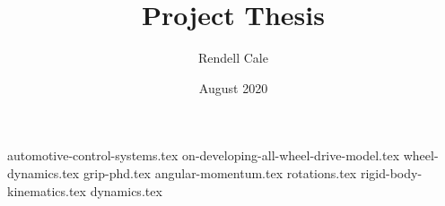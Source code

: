 \documentclass{article}
\title{Project Thesis}
\author{Rendell Cale}
\date{August 2020}
\begin{document}
\maketitle

{automotive-control-systems.tex}
{on-developing-all-wheel-drive-model.tex}
{wheel-dynamics.tex}
{grip-phd.tex}
{angular-momentum.tex}
{rotations.tex}
{rigid-body-kinematics.tex}
{dynamics.tex}

\printbibliography
\end{document}
